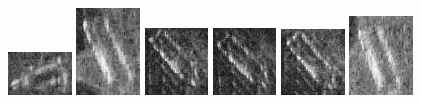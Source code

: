 \begin{figure}
    \includegraphics[width=0.15\textwidth]{chapters/images/dataset/all-class-images/bottle/bottle-85.jpg}
    \includegraphics[width=0.15\textwidth]{chapters/images/dataset/all-class-images/bottle/bottle-360.jpg}
    \includegraphics[width=0.15\textwidth]{chapters/images/dataset/all-class-images/bottle/bottle-204.jpg}
    \includegraphics[width=0.15\textwidth]{chapters/images/dataset/all-class-images/bottle/bottle-208.jpg}
    \includegraphics[width=0.15\textwidth]{chapters/images/dataset/all-class-images/bottle/bottle-157.jpg}
    \includegraphics[width=0.15\textwidth]{chapters/images/dataset/all-class-images/bottle/bottle-285.jpg}
    

\end{figure}

